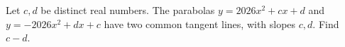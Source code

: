 Let $c,d$ be distinct real numbers. The parabolas $y=2026x^2+cx+d$ and $y=-2026x^2+dx+c$ have two common tangent lines, with slopes $c,d$. Find $c-d$.
